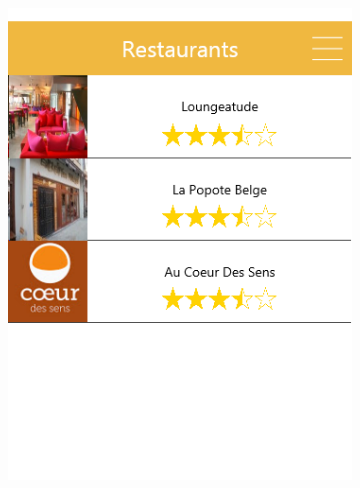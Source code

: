 \documentclass{eplmastersthesis}
\begin{document}
\begin{figure}[H]
\begin{subfigure}[b]{0.3\textwidth}
        \includegraphics[width=\textwidth]{Images/InVision/liste-resto.png}
    \end{subfigure}
\end{figure}
\end{document}
